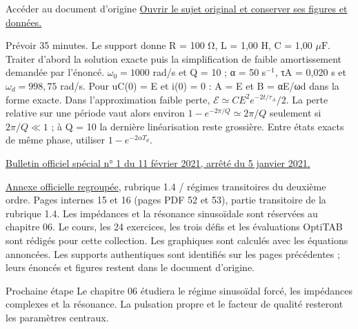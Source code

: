 \begin{loi}{Accéder au document d’origine}
\href{https://mpsi.schleck.ovh/fichiers/td/td5_oscillateurs.pdf}{Ouvrir le sujet original et conserver ses figures et données.}
\end{loi}
Prévoir 35 minutes. Le support donne R = 100 Ω, L = 1,00 H, C = 1,00 $\mu\mathrm{ F}$. Traiter d’abord la solution exacte puis la simplification de faible amortissement demandée par l’énoncé.
$\omega_0=1000$ rad/s et Q = 10 ; α = 50 s$^{-1}$, τA = 0,020 s et $\omega_d=998{,}75$ rad/s. Pour uC(0) = E et i(0) = 0 : A = E et B = αE/ωd dans la forme exacte. Dans l’approximation faible perte, $\mathcal E\simeq CE^2e^{-2t/\tau_A}/2$. La perte relative sur une période vaut alors environ $1-e^{-2\pi/Q}\simeq2\pi/Q$ seulement si $2\pi/Q\ll1$ ; à Q = 10 la dernière linéarisation reste grossière. Entre états exacts de même phase, utiliser $1-e^{-2\alpha T_d}$.

\href{https://www.education.gouv.fr/bo/21/Special1/ESRS2035779A.htm}{Bulletin officiel spécial n° 1 du 11 février 2021, arrêté du 5 janvier 2021.}\par
\href{https://cache.media.education.gouv.fr/file/SPE1-MEN-MESRI-4-2-2021/64/8/spe779_annexe_1373648.pdf}{Annexe officielle regroupée}, rubrique 1.4 / régimes transitoires du deuxième ordre. Pages internes 15 et 16 (pages PDF 52 et 53), partie transitoire de la rubrique 1.4. Les impédances et la résonance sinusoïdale sont réservées au chapitre 06.
Le cours, les 24 exercices, les trois défis et les évaluations OptiTAB sont rédigés pour cette collection. Les graphiques sont calculés avec les équations annoncées. Les supports authentiques sont identifiés sur les pages précédentes ; leurs énoncés et figures restent dans le document d’origine.
\begin{methode}{Prochaine étape}
Le chapitre 06 étudiera le régime sinusoïdal forcé, les impédances complexes et la résonance. La pulsation propre et le facteur de qualité resteront les paramètres centraux.
\end{methode}

